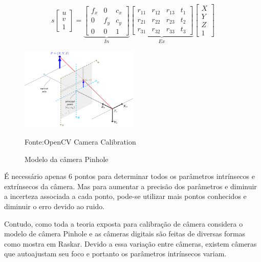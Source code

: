 \begin{equation}
\label{eq:matrizes}
s
\begin{bmatrix}
u \\
v \\
1
\end{bmatrix}
=
\underbrace{
\begin{bmatrix}
f_x & 0 & c_x \\
0 & f_y & c_y \\
0 & 0 & 1
\end{bmatrix}}_{In}
\underbrace{
\begin{bmatrix}
r_{11} & r_{12} & r_{13} & t_{1} \\
r_{21} & r_{22} & r_{23} & t_{2} \\
r_{31} & r_{32} & r_{33} & t_{3}
\end{bmatrix}}_{Ex}
\begin{bmatrix}
X \\
Y \\
Z \\
1
\end{bmatrix}
\end{equation} 

\begin{figure}[!ht]
\centering
\label{fig:PinholeCamera}
\includegraphics[width=0.5\textwidth]{img/PinholeCameraModel.png}
\caption{Modelo da câmera Pinhole}
\small{Fonte:OpenCV Camera Calibration}\cite{CameraCalibration}
\end{figure}

É necessário apenas 6 pontos para determinar todos os parâmetros intrínsecos e extrínsecos da câmera. Mas para aumentar a precisão dos parâmetros e diminuir a incerteza associada a cada ponto, pode-se utilizar mais pontos conhecidos e diminuir o erro devido ao ruido.

Contudo, como toda a teoria exposta para calibração de câmera considera o modelo de câmera Pinhole e as câmeras digitais são feitas de diversas formas como mostra em Raskar\cite{raskar}. Devido a essa variação entre câmeras, existem câmeras que autoajustam seu foco e portanto os parâmetros intrínsecos variam.
